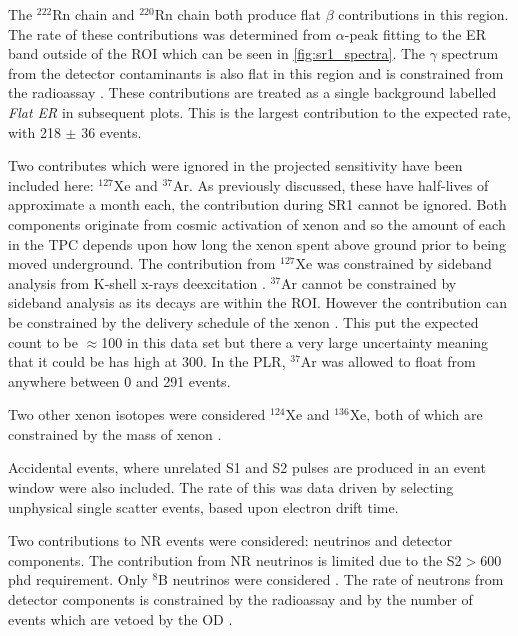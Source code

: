 \par
The ${}^{222}$Rn chain and ${}^{220}$Rn chain both produce flat $\beta$ contributions in this region.
The rate of these contributions was determined from $\alpha$-peak fitting to the ER band outside of the ROI which can be seen in \autoref{fig:sr1_spectra}.
The $\gamma$ spectrum from the detector contaminants is also flat in this region and is constrained from the radioassay \cite{LZ_assay_ref}.
These contributions are treated as a single background labelled \textit{Flat ER} in subsequent plots.
This is the largest contribution to the expected rate, with 218 $\pm$ 36 events.
\par
Two contributes which were ignored in the projected sensitivity have been included here: ${}^{127}$Xe and ${}^{37}$Ar.
As previously discussed, these have half-lives of approximate a month each, the contribution during SR1 cannot be ignored.
Both components originate from cosmic activation of xenon and so the amount of each in the TPC depends upon how long the xenon spent above ground prior to being moved underground.
The contribution from $^{127}$Xe was constrained by sideband analysis from K-shell x-rays deexcitation \cite{marisarthurs_thesis_ref}.
${}^{37}$Ar cannot be constrained by sideband analysis as its decays are within the ROI.
However the contribution can be constrained by the delivery schedule of the xenon \cite{lz_argon37_ref}.
This put the expected count to be $\approx$100 in this data set but there a very large uncertainty meaning that it could be has high at 300.
In the PLR, ${}^{37}$Ar was allowed to float from anywhere between 0 and 291 events.
\par
Two other xenon isotopes were considered ${}^{124}$Xe and ${}^{136}$Xe, both of which are constrained by the mass of xenon \cite{lz_ws_sr1_ref}.
\par
Accidental events, where unrelated S1 and S2 pulses are produced in an event window were also included.
The rate of this was data driven by selecting unphysical single scatter events, based upon electron drift time.
\par
Two contributions to NR events were considered: neutrinos and detector components.
The contribution from NR neutrinos is limited due to the S2$>$600 phd requirement.
Only ${}^{8}$B neutrinos were considered \cite{lz_ws_sr1_ref}.
The rate of neutrons from detector components is constrained by the radioassay and by the number of events which are vetoed by the OD \cite{lz_sr1_backgrounds_ref}.





